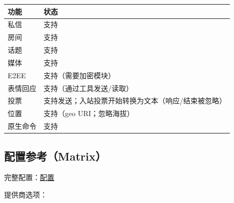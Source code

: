 \begin{table}[h]
\centering
\small
\begin{tabular}{|l|l|}
\hline
功能 & 状态 \\
\hline
私信 & \emoji{✅} 支持 \\
\hline
房间 & \emoji{✅} 支持 \\
\hline
话题 & \emoji{✅} 支持 \\
\hline
媒体 & \emoji{✅} 支持 \\
\hline
E2EE & \emoji{✅} 支持（需要加密模块） \\
\hline
表情回应 & \emoji{✅} 支持（通过工具发送/读取） \\
\hline
投票 & \emoji{✅} 支持发送；入站投票开始转换为文本（响应/结束被忽略） \\
\hline
位置 & \emoji{✅} 支持（geo URI；忽略海拔） \\
\hline
原生命令 & \emoji{✅} 支持 \\
\hline
\end{tabular}
\end{table}



\subsection{配置参考（Matrix）}


完整配置：\href{/gateway/configuration}{配置}

提供商选项：


